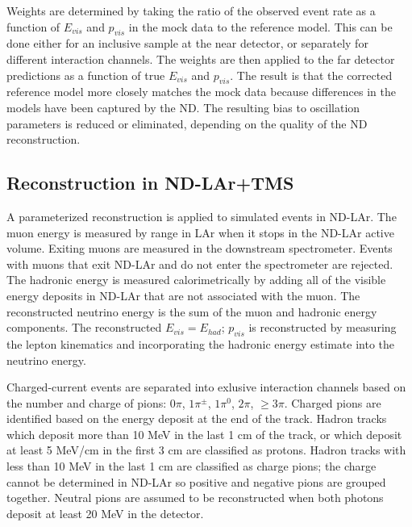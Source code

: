 \documentclass[11pt]{article}
\begin{document}
Weights are determined by taking the ratio of the observed event rate as a function of $E_{vis}$ and $p_{vis}$ in the mock data to the reference model. This can be done either for an inclusive sample at the near detector, or separately for different interaction channels. The weights are then applied to the far detector predictions as a function of true $E_{vis}$ and $p_{vis}$. The result is that the corrected reference model more closely matches the mock data because differences in the models have been captured by the ND. The resulting bias to oscillation parameters is reduced or eliminated, depending on the quality of the ND reconstruction.

\subsection{Reconstruction in ND-LAr+TMS}

A parameterized reconstruction is applied to simulated events in ND-LAr. The muon energy is measured by range in LAr when it stops in the ND-LAr active volume. Exiting muons are measured in the downstream spectrometer. Events with muons that exit ND-LAr and do not enter the spectrometer are rejected. The hadronic energy is measured calorimetrically by adding all of the visible energy deposits in ND-LAr that are not associated with the muon. The reconstructed neutrino energy is the sum of the muon and hadronic energy components. The reconstructed $E_{vis} = E_{had}$; $p_{vis}$ is reconstructed by measuring the lepton kinematics and incorporating the hadronic energy estimate into the neutrino energy. 

Charged-current events are separated into exlusive interaction channels based on the number and charge of pions: $0 \pi$, $1 \pi^{\pm}$, $1 \pi^{0}$, $2 \pi$, $\ge 3 \pi$. Charged pions are identified based on the energy deposit at the end of the track. Hadron tracks which deposit more than 10 MeV in the last 1 cm of the track, or which deposit at least 5 MeV/cm in the first 3 cm are classified as protons. Hadron tracks with less than 10 MeV in the last 1 cm are classified as charge pions; the charge cannot be determined in ND-LAr so positive and negative pions are grouped together. Neutral pions are assumed to be reconstructed when both photons deposit at least 20 MeV in the detector.
\end{document}
